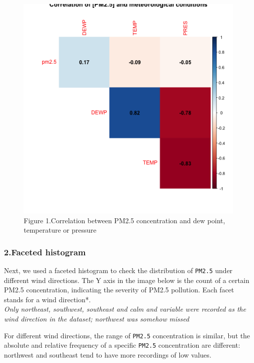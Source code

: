 \documentclass[
]{article}
\begin{document}
\begin{figure}
\centering
\includegraphics{../images/corr.png}
\caption{Figure 1.Correlation between PM2.5 concentration and dew point,
temperature or pressure}
\end{figure}

\hypertarget{faceted-histogram}{%
\subsubsection{2.Faceted histogram}\label{faceted-histogram}}

Next, we used a faceted histogram to check the distribution of
\texttt{PM2.5} under different wind directions. The Y axis in the image
below is the count of a certain PM2.5 concentration, indicating the
severity of PM2.5 pollution. Each facet stands for a wind direction*.\\
\emph{Only northeast, southwest, southeast and calm and variable were
recorded as the wind direction in the dataset; northwest was somehow
missed}

For different wind directions, the range of \texttt{PM2.5} concentration
is similar, but the absolute and relative frequency of a specific
\texttt{PM2.5} concentration are different: northwest and southeast tend
to have more recordings of low values.
\end{document}
